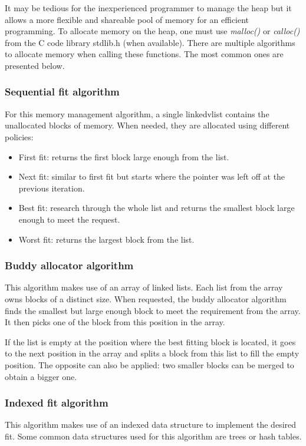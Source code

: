 It may be tedious for the inexperienced programmer to manage the heap
    but it allows a more flexible and shareable pool of memory for an efficient programming.
To allocate memory on the heap, one must use \textit{malloc()} or \textit{calloc()} from the C code library stdlib.h (when available).
There are multiple algorithms to allocate memory when calling these functions.
The most common ones are presented below.

\subsubsection{Sequential fit algorithm}
For this memory management algorithm, a single linkedvlist contains the unallocated blocks of memory.
When needed, they are allocated using different policies:
\begin{itemize}
    \item First fit: returns the first block large enough from the list.
    \item Next fit: similar to first fit but starts where the pointer was left off at the previous iteration.
    \item Best fit: research through the whole list and returns the smallest block large enough to meet the request.
    \item Worst fit: returns the largest block from the list.
\end{itemize}

\subsubsection{Buddy allocator algorithm}
This algorithm makes use of an array of linked lists.
Each list from the array owns blocks of a distinct size.
When requested, the buddy allocator algorithm finds the smallest but large enough block to meet the requirement from the array.
It then picks one of the block from this position in the array.

If the list is empty at the position where the best fitting block is located, it goes to the next position in the array
and splits a block from this list to fill the empty position.
The opposite can also be applied: two smaller blocks can be merged to obtain a bigger one.

\subsubsection{Indexed fit algorithm}
This algorithm makes use of an indexed data structure to implement the desired fit.
Some common data structures used for this algorithm are trees or hash tables.

